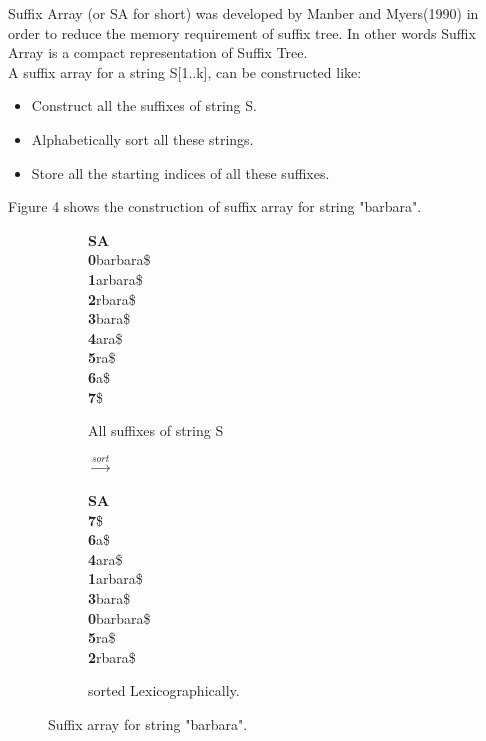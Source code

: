 \documentclass[11pt,a4paper]{report}
\begin{document}
Suffix Array (or SA for short) was developed by Manber and Myers(1990) 
in order to reduce the memory requirement of suffix tree. In other words 
Suffix Array is a compact representation of Suffix Tree. \\
A suffix array for a string S[1..k], can be constructed like:
\begin{itemize} 
	\item  Construct all the suffixes of string S.
	\item  Alphabetically sort all these strings.
	\item Store all the starting indices of all these suffixes.
\end{itemize}
Figure 4 shows the construction of suffix array for string "barbara".
\begin{figure}[H]
\centering
\begin{subfigure}{.2\textwidth}
\textbf{SA}  \\
\enspace  \textbf{0}\quad barbara\$\\
\textbf{1}\quad arbara\$\\
\textbf{2}\quad rbara\$\\
\textbf{3}\quad  bara\$\\
\textbf{4}\quad   ara\$\\
\textbf{5}\quad     ra\$\\
\textbf{6}\quad     a\$\\
\textbf{7}\quad       \$
  \caption{All suffixes of string S}
  \label{fig:sub1}
\end{subfigure}%
\begin{subfigure}{.2\textwidth}
\textbf{$\xrightarrow{sort}$}
\label{fig:sub1}
\end{subfigure}%
\begin{subfigure}{.3\textwidth}
\textbf{SA} \\
\textbf{7}\quad \$\\
\textbf{6}\quad a\$\\
\textbf{4}\quad ara\$\\
\textbf{1}\quad arbara\$\\
\textbf{3}\quad bara\$\\
\textbf{0}\quad barbara\$\\
\textbf{5}\quad ra\$\\
\textbf{2}\quad rbara\$
 \caption{sorted  Lexicographically.}
  \label{fig:Burrows-Wheeler transform}
\end{subfigure}
\caption{Suffix array for string "barbara".}
\label{fig:test}
\end{figure}
\end{document}
